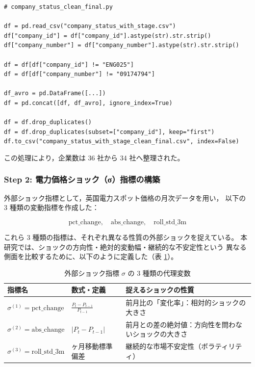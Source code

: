 \begin{verbatim}
# company_status_clean_final.py

df = pd.read_csv("company_status_with_stage.csv")
df["company_id"] = df["company_id"].astype(str).str.strip()
df["company_number"] = df["company_number"].astype(str).str.strip()

df = df[df["company_id"] != "ENG025"]
df = df[df["company_number"] != "09174794"]

df_avro = pd.DataFrame([...])
df = pd.concat([df, df_avro], ignore_index=True)

df = df.drop_duplicates()
df = df.drop_duplicates(subset=["company_id"], keep="first")
df.to_csv("company_status_with_stage_clean_final.csv", index=False)
\end{verbatim}

この処理により，企業数は 36 社から 34 社へ整理された。

\subsubsection*{Step 2: 電力価格ショック（σ）指標の構築}

外部ショック指標として，英国電力スポット価格の月次データを用い，
以下の 3 種類の変動指標を作成した：


\[
\text{pct\_change},\quad
\text{abs\_change},\quad
\text{roll\_std\_3m}
\]


これら 3 種類の指標は、それぞれ異なる性質の外部ショックを捉えている。
本研究では、ショックの方向性・絶対的変動幅・継続的な不安定性という
異なる側面を比較するために、以下のように定義した（表 \ref{tab:sigma_proxy}）。

\begin{table}[H]
\centering
\caption{外部ショック指標 $\sigma$ の 3 種類の代理変数}
\label{tab:sigma_proxy}
\begin{tabular}{p{3cm} p{4cm} p{6cm}}
\hline
指標名 & 数式・定義 & 捉えるショックの性質 \\
\hline

$\sigma^{(1)} = \text{pct\_change}$ &
\centering $\displaystyle \frac{P_t - P_{t-1}}{P_{t-1}}$ &
前月比の「変化率」：相対的ショックの大きさ \\

$\sigma^{(2)} = \text{abs\_change}$ &
\centering $\displaystyle |P_t - P_{t-1}|$ &
前月との差の絶対値：方向性を問わないショックの大きさ \\

$\sigma^{(3)} = \text{roll\_std\_3m}$ &
\centering 3 ヶ月移動標準偏差 &
継続的な市場不安定性（ボラティリティ） \\
\hline
\end{tabular}
\end{table}


